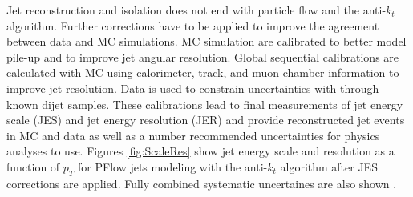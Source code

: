 Jet reconstruction and isolation does not end with particle flow and the anti-$k_t$ algorithm. Further corrections have to be applied to improve the agreement between data and MC simulations. MC simulation are calibrated to better model pile-up and to improve jet angular resolution. Global sequential calibrations are calculated with MC using calorimeter, track, and muon chamber information to improve jet resolution. Data is used to constrain uncertainties with through known dijet samples. These calibrations lead to final measurements of jet energy scale (JES) and jet energy resolution (JER) and provide reconstructed jet events in MC and data as well as a number recommended uncertainties for physics analyses to use.  Figures \ref{fig:ScaleRes} show jet energy scale and resolution as a function of $p_T$ for PFlow jets modeling with the anti-$k_t$ algorithm after JES corrections are applied. Fully combined systematic uncertaines are also shown \cite{jetscaleres}.
